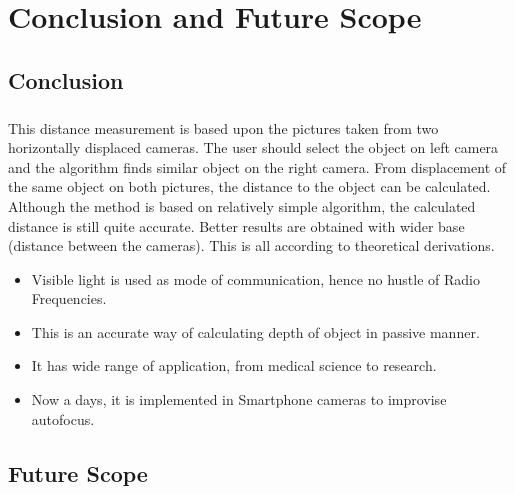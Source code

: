 \chapter{Conclusion and Future Scope}
\section{Conclusion}
\paragraph{}This distance
measurement is based upon the pictures taken from two
horizontally displaced cameras. The user should select the
object on left camera and the algorithm finds similar object
on the right camera. From displacement of the same object
on both pictures, the distance to the object can be calculated.
Although the method is based on relatively simple
algorithm, the calculated distance is still quite accurate.
Better results are obtained with wider base (distance between
the cameras). This is all according to theoretical derivations.
\begin{itemize}
	\item Visible light is used as mode of communication, hence no hustle of Radio Frequencies.
	\item This is an accurate way of calculating depth of object in passive manner.
	\item It has wide range of application, from medical science to research.
	\item Now a days, it is implemented in Smartphone cameras to improvise autofocus.
	
\end{itemize}
\newpage
\section{Future Scope}
